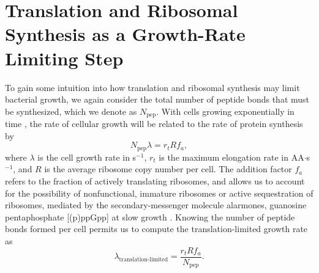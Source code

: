 
\section{Translation and Ribosomal Synthesis as a Growth-Rate Limiting Step}

To gain some intuition into how translation and ribosomal synthesis may limit
bacterial growth, we again consider the total number of peptide bonds that must
be synthesized, which we denote as $N_\text{pep}$. With cells growing exponentially in time
\citep{godin2010}, the rate of cellular growth will be related to the rate of protein synthesis by
\begin{equation}
    N_\text{pep} \lambda = r_t R f_a,
    \label{eq:mass_balance}
\end{equation}
where $\lambda$ is the cell growth rate in s$^{-1}$, $r_t$ is the maximum
elongation rate in AA$\cdot$s$^{-1}$, and $R$ is the average ribosome copy
number per cell. The addition factor $f_a$ refers to the fraction of actively
translating ribosomes, and allows us to account for the possibility of
nonfunctional, immature ribosomes or active sequestration of ribosomes, mediated
by the secondary-messenger molecule alarmones, guanosine pentaphosphate
[(p)ppGpp] at slow growth \citep{dennis2004, dai2016}. Knowing the number of
peptide bonds formed per cell permits us to compute the translation-limited growth
rate as
\begin{equation}
\lambda_\text{translation-limited} = \frac{r_t R f_a}{N_\text{pep}}.
\label{eq:lambda_limit}
\end{equation}


